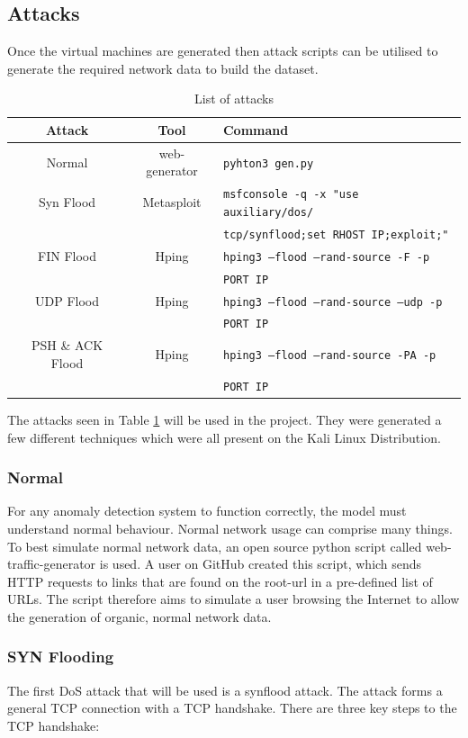 \subsection{Attacks}
Once the virtual machines are generated then attack scripts can be utilised to generate the required network data to build the dataset. 
\begin{table}[H]
 \caption{List of attacks}
 \label{table:attacks}
 \begin{tabular}{|c|c|l|}
 \hline
 \textbf{Attack}&\textbf{Tool}&\textbf{Command} \\
 \hline
 Normal& web-generator & \texttt{pyhton3 gen.py}\\
 \hline
 Syn Flood& Metasploit& \texttt{msfconsole -q -x "use auxiliary/dos/}\\
 &&\texttt{tcp/synflood;set RHOST IP;exploit;"}\\
 \hline
 FIN Flood&Hping&\texttt{hping3 --flood --rand-source -F -p }\\
 &&\texttt{PORT IP}\\
 \hline
 UDP Flood&Hping&\texttt{hping3 --flood --rand-source --udp -p }\\
 &&\texttt{PORT IP}\\
 \hline
 PSH \& ACK Flood&Hping&\texttt{hping3 --flood --rand-source -PA -p}\\
 &&\texttt{PORT IP}\\
 \hline
\end{tabular}
\end{table}
The attacks seen in Table \ref{table:attacks} will be used in the project. They were generated a few different techniques which were all present on the Kali Linux Distribution.

\subsubsection{Normal}
For any anomaly detection system to function correctly, the model must understand normal behaviour. Normal network usage can comprise many things. To best simulate normal network data, an open source python script called web-traffic-generator is used\cite{wtg}. A user on GitHub created this script, which sends HTTP requests to links that are found on the root-url in a pre-defined list of URLs. The script therefore aims to simulate a user browsing the Internet to allow the generation of organic, normal network data.

\subsubsection{SYN Flooding}
The first DoS attack that will be used is a synflood attack. The attack forms a general TCP connection with a TCP handshake. There are three key steps to the TCP handshake\cite{tcp_hand}:

